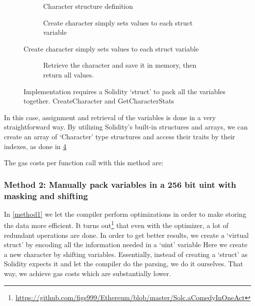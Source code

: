 \begin{figure}[H]
  \begin{subfigure}[b]{\textwidth}
    \centering
    
    \caption{Character structure definition}
    \label{fig:struct_optimization:a}
  \end{subfigure}

  \begin{subfigure}[b]{\textwidth}
    \centering
    
    \caption{Create character simply sets values to each struct variable}
    \label{fig:struct_optimization:b}
  \end{subfigure}
\end{figure}

\begin{figure}[H] \ContinuedFloat
  \begin{subfigure}[b]{\textwidth}
    \centering
    
    \caption{Retrieve the character and save it in memory, then return all values.}
    \label{fig:struct_optimization:c}
  \end{subfigure}
  \label{fig:struct_optimization}
  \caption{Implementation requires a Solidity `struct' to pack all the variables together. CreateCharacter and GetCharacterStats  }
\end{figure}

In this case, assignment and retrieval of the variables is done in a very straightforward way. By utilizing Solidity's built-in structures and arrays, we can create an array of `Character' type structures and access their traits by their indexes, as done in \ref{fig:struct_optimization:c}

The gas costs per function call with this method are: 



\subsubsection{Method 2: Manually pack variables in a 256 bit uint with masking and shifting} \label{method2}
In \ref{method1} we let the compiler perform optimizations in order to make storing the data more efficient. It turns out\footnote{\url{https://github.com/figs999/Ethereum/blob/master/Solc.aComedyInOneAct}} that even with the optimizer, a lot of redundant operations are done. In order to get better results, we create a `virtual struct' by encoding all the information needed in a `uint' variable 
Here we create a new character by shifting variables. Essentially, instead of creating a `struct' as Solidity expects it and let the compiler do the parsing, we do it ourselves. That way, we achieve gas costs which are substantially lower.

